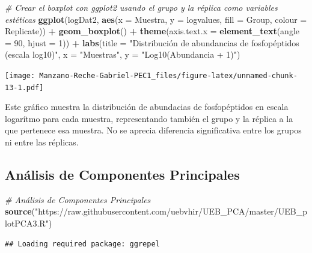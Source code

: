 \documentclass[
]{article}
\newenvironment{Shaded}{\begin{snugshade}}{\end{snugshade}}
\newcommand{\AttributeTok}[1]{\textcolor[rgb]{0.13,0.29,0.53}{#1}}
\newcommand{\CommentTok}[1]{\textcolor[rgb]{0.56,0.35,0.01}{\textit{#1}}}
\newcommand{\DecValTok}[1]{\textcolor[rgb]{0.00,0.00,0.81}{#1}}
\newcommand{\FunctionTok}[1]{\textcolor[rgb]{0.13,0.29,0.53}{\textbf{#1}}}
\newcommand{\NormalTok}[1]{#1}
\newcommand{\SpecialCharTok}[1]{\textcolor[rgb]{0.81,0.36,0.00}{\textbf{#1}}}
\newcommand{\StringTok}[1]{\textcolor[rgb]{0.31,0.60,0.02}{#1}}
\begin{document}
\begin{Shaded}
\begin{Highlighting}[]
\CommentTok{\# Crear el boxplot con ggplot2 usando el grupo y la réplica como variables estéticas}
\FunctionTok{ggplot}\NormalTok{(logDat2, }\FunctionTok{aes}\NormalTok{(}\AttributeTok{x =}\NormalTok{ Muestra, }\AttributeTok{y =}\NormalTok{ logvalues, }\AttributeTok{fill =}\NormalTok{ Group, }\AttributeTok{colour =}\NormalTok{ Replicate)) }\SpecialCharTok{+} 
  \FunctionTok{geom\_boxplot}\NormalTok{() }\SpecialCharTok{+}
  \FunctionTok{theme}\NormalTok{(}\AttributeTok{axis.text.x =} \FunctionTok{element\_text}\NormalTok{(}\AttributeTok{angle =} \DecValTok{90}\NormalTok{, }\AttributeTok{hjust =} \DecValTok{1}\NormalTok{)) }\SpecialCharTok{+}
  \FunctionTok{labs}\NormalTok{(}\AttributeTok{title =} \StringTok{"Distribución de abundancias de fosfopéptidos (escala log10)"}\NormalTok{,}
       \AttributeTok{x =} \StringTok{"Muestras"}\NormalTok{,}
       \AttributeTok{y =} \StringTok{"Log10(Abundancia + 1)"}\NormalTok{)}
\end{Highlighting}
\end{Shaded}

\texttt{[image: Manzano-Reche-Gabriel-PEC1\_files/figure-latex/unnamed-chunk-13-1.pdf]}

Este gráfico muestra la distribución de abundacias de fosfopéptidos en
escala logarítmo para cada muestra, representando también el grupo y la
réplica a la que pertenece esa muestra. No se aprecia diferencia
significativa entre los grupos ni entre las réplicas.

\subsection{Análisis de Componentes
Principales}\label{anuxe1lisis-de-componentes-principales}

\begin{Shaded}
\begin{Highlighting}[]
\CommentTok{\# Análisis de Componentes Principales}
\FunctionTok{source}\NormalTok{(}\StringTok{"https://raw.githubusercontent.com/uebvhir/UEB\_PCA/master/UEB\_plotPCA3.R"}\NormalTok{)}
\end{Highlighting}
\end{Shaded}

\begin{verbatim}
## Loading required package: ggrepel
\end{verbatim}
\end{document}
